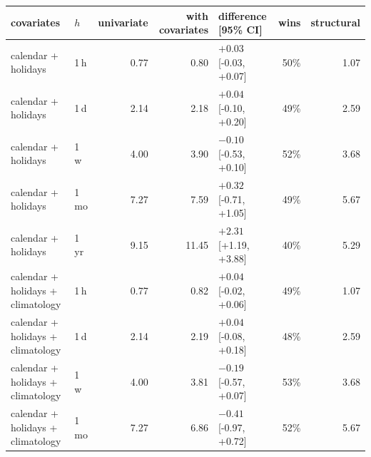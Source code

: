 \begin{tabular}{llrrlrr}
\toprule
covariates & $h$ & univariate & with covariates & difference [95\% CI] & wins & structural \\
\midrule
calendar + holidays & 1\,h & 0.77 & 0.80 & $+0.03$ [-0.03, +0.07] & 50\% & 1.07 \\
calendar + holidays & 1\,d & 2.14 & 2.18 & $+0.04$ [-0.10, +0.20] & 49\% & 2.59 \\
calendar + holidays & 1\,w & 4.00 & 3.90 & $-0.10$ [-0.53, +0.10] & 52\% & 3.68 \\
calendar + holidays & 1\,mo & 7.27 & 7.59 & $+0.32$ [-0.71, +1.05] & 49\% & 5.67 \\
calendar + holidays & 1\,yr & 9.15 & 11.45 & $+2.31$ [+1.19, +3.88] & 40\% & 5.29 \\
calendar + holidays + climatology & 1\,h & 0.77 & 0.82 & $+0.04$ [-0.02, +0.06] & 49\% & 1.07 \\
calendar + holidays + climatology & 1\,d & 2.14 & 2.19 & $+0.04$ [-0.08, +0.18] & 48\% & 2.59 \\
calendar + holidays + climatology & 1\,w & 4.00 & 3.81 & $-0.19$ [-0.57, +0.07] & 53\% & 3.68 \\
calendar + holidays + climatology & 1\,mo & 7.27 & 6.86 & $-0.41$ [-0.97, +0.72] & 52\% & 5.67 \\
\bottomrule
\end{tabular}
